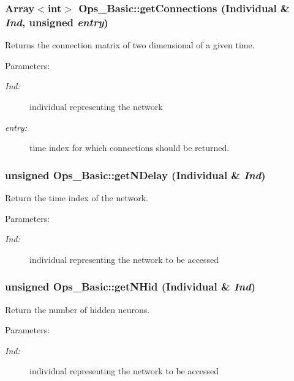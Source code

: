 \subsubsection{\setlength{\rightskip}{0pt plus 5cm}Array$<$int$>$ Ops\_\-Basic::get\-Connections (Individual \& {\em Ind}, unsigned {\em entry})}\label{classOps__Basic_a3}


Returns the connection matrix of two dimensional of a given time.

\begin{Desc}
\item[Parameters: ]\par
\begin{description}
\item[{\em 
Ind:}]individual representing the network \item[{\em 
entry:}]time index for which connections should be returned. \end{description}
\end{Desc}
\subsubsection{\setlength{\rightskip}{0pt plus 5cm}unsigned Ops\_\-Basic::get\-NDelay (Individual \& {\em Ind})}\label{classOps__Basic_a9}


Return the time index of the network.

\begin{Desc}
\item[Parameters: ]\par
\begin{description}
\item[{\em 
Ind:}]individual representing the network to be accessed \end{description}
\end{Desc}
\subsubsection{\setlength{\rightskip}{0pt plus 5cm}unsigned Ops\_\-Basic::get\-NHid (Individual \& {\em Ind})}\label{classOps__Basic_a7}


Return the number of hidden neurons.

\begin{Desc}
\item[Parameters: ]\par
\begin{description}
\item[{\em 
Ind:}]individual representing the network to be accessed \end{description}
\end{Desc}
